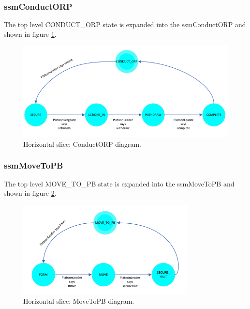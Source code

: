 \documentclass[../../main/main.tex]{subfiles}
\begin{document}
\subsubsection{ssmConductORP}\label{sssec:ssmConductORP}
The top level CONDUCT_ORP state is expanded into the ssmConductORP  and shown in figure \ref{ssmConductORPDiagram}.


\begin{figure}[h!]
\centering
\includegraphics[width=\textwidth]{../figures/ssmConductORPDiagram}
\caption{\label{ssmConductORPDiagram} Horizontal slice: ConductORP diagram.}
\end{figure}
\clearpage
\subsubsection{ssmMoveToPB}\label{sssec:ssmMoveToPB}
The top level MOVE_TO_PB state is expanded into the ssmMoveToPB  and shown in figure \ref{ssmMoveToPBDiagram}.


\begin{figure}[h!]
\centering
\includegraphics[width=0.8\textwidth]{../figures/ssmMoveToPBDiagram}
\caption{\label{ssmMoveToPBDiagram} Horizontal slice: MoveToPB diagram.}
\end{figure}
\clearpage
\end{document}
